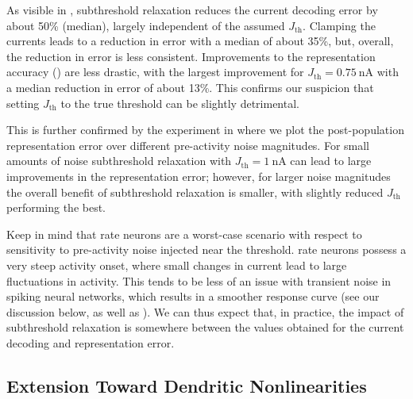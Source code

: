 As visible in , subthreshold relaxation reduces the current decoding error by about 50\% (median), largely independent of the assumed $J_\mathrm{th}$.
Clamping the currents leads to a reduction in error with a median of about 35\%, but, overall, the reduction in error is less consistent.
Improvements to the representation accuracy () are less drastic, with the largest improvement for $J_\mathrm{th} = \SI{0.75}{\nano\ampere}$ with a median reduction in error of about 13\%.
This confirms our suspicion that setting $J_\mathrm{th}$ to the true threshold can be slightly detrimental.

This is further confirmed by the experiment in  where we plot the post-population representation error over different pre-activity noise magnitudes.
For small amounts of noise subthreshold relaxation with $J_\mathrm{th} = \SI{1}{\nano\ampere}$ can lead to large improvements in the representation error; however, for larger noise magnitudes the overall benefit of subthreshold relaxation is smaller, with slightly reduced $J_\mathrm{th}$ performing the best.

Keep in mind that \LIF rate neurons are a worst-case scenario with respect to sensitivity to pre-activity noise injected near the threshold.
\LIF rate neurons possess a very steep activity onset, where small changes in current lead to large fluctuations in activity.
This tends to be less of an issue with transient noise in spiking neural networks, which results in a smoother response curve (see our discussion below, as well as \cite{hunsberger2015spiking}).
We can thus expect that, in practice, the impact of subthreshold relaxation is somewhere between the values obtained for the current decoding and representation error.

\subsection{Extension Toward Dendritic Nonlinearities}
\label{sec:nef_nonlinear}

